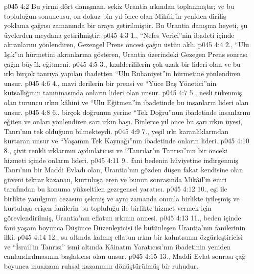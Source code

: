 \vs p045 4:2 Bu yirmi dört danışman, sekiz Urantia ırkından toplanmıştır; ve bu topluluğun sonuncusu, on dokuz bin yıl önce olan Mikâil’in yeniden diriliş yoklama çağrısı zamanında bir araya getirilmiştir. Bu Urantia danışma heyeti, şu üyelerden meydana getirilmiştir:
\vs p045 4:3 1.\bibnobreakspace {}, “Nefes Verici”nin ibadeti içinde akranlarını yönlendiren, Gezengel Prens öncesi çağın üstün aklı.
\vs p045 4:4 2.\bibnobreakspace {}, “Ulu Işık”ın hürmetini akranlarına gösteren, Urantia üzerindeki Gezegen Prens sonrası çağın büyük eğitmeni.
\vs p045 4:5 3.\bibnobreakspace {}, kızılderililerin çok uzak bir lideri olan ve bu ırkı birçok tanrıya yapılan ibadetten “Ulu Ruhaniyet”in hürmetine yönlendiren unsur.
\vs p045 4:6 4.\bibnobreakspace {}, mavi derilerin bir prensi ve “Yüce Baş Yönetici”nin kutsallığının tanınmasında onların lideri olan unsur.
\vs p045 4:7 5.\bibnobreakspace {}, nesli tükenmiş olan turuncu ırkın kâhini ve “Ulu Eğitmen”in ibadetinde bu insanların lideri olan unsur.
\vs p045 4:8 6.\bibnobreakspace {}, birçok doğrunun yerine “Tek Doğru”nun ibadetinde insanlarını eğiten ve onları yönlendiren sarı ırkın başı. Binlerce yıl önce bu sarı ırkın üyesi, Tanrı’nın tek olduğunu bilmekteydi.
\vs p045 4:9 7.\bibnobreakspace {}, yeşil ırkı karanlıklarından kurtaran unsur ve “Yaşamın Tek Kaynağı”nın ibadetinde onların lideri.
\vs p045 4:10 8.\bibnobreakspace {}, çivit renkli ırklarının aydınlatıcısı ve “Tanrılar’ın Tanrısı”nın bir önceki hizmeti içinde onların lideri.
\vs p045 4:11 9.\bibnobreakspace {}, fani bedenin hüviyetine indirgenmiş Tanrı’nın bir Maddi Evladı olan, Urantia’nın gözden düşen fakat kendisine olan güveni tekrar kazanan, kurtuluşa eren ve bunun sonrasında Mikâil’in emri tarafından bu konuma yükseltilen gezegensel yaratıcı.
\vs p045 4:12 10.\bibnobreakspace {}, eşi ile birlikte yanılgının cezasını çekmiş ve aynı zamanda onunla birlikte iyileşmiş ve kurtuluşa erişen fanilerin bu topluluğu ile birlikte hizmet vermek için görevlendirilmiş, Urantia’nın eflatun ırkının annesi.
\vs p045 4:13 11.\bibnobreakspace {}, beden içinde fani yaşam boyunca Düşünce Düzenleyicisi ile bütünleşen Urantia’nın fanilerinin ilki.
\vs p045 4:14 12.\bibnobreakspace {}, su altında kalmış eflatun ırkın bir kalıntısının özgürleştiricisi ve “İsrail’in Tanrısı” ismi altında Kâinatın Yaratıcısı’nın ibadetinin yeniden canlandırılmasının başlatıcısı olan unsur.
\vs p045 4:15 13.\bibnobreakspace {}, Maddi Evlat sonrası çağ boyunca muazzam ruhsal kazanımın dönüştürülmüş bir ruhudur.
